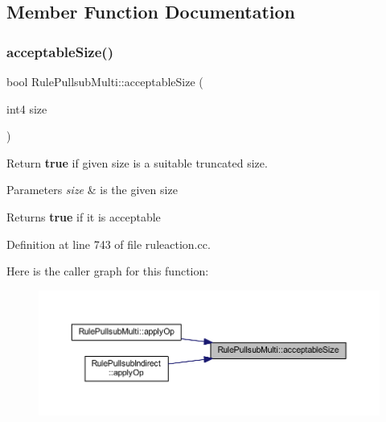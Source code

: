 \subsection{Member Function Documentation}
\mbox{\label{class_rule_pullsub_multi_a9bbbf48ca07f76c7d40a53feb65eded7}} 
\subsubsection{\texorpdfstring{acceptableSize()}{acceptableSize()}}
{\footnotesize\ttfamily bool Rule\+Pullsub\+Multi\+::acceptable\+Size (\begin{DoxyParamCaption}\item[{int4}]{size }\end{DoxyParamCaption})\hspace{0.3cm}{\ttfamily [static]}}



Return {\bfseries{true}} if given size is a suitable truncated size. 


\begin{DoxyParams}{Parameters}
{\em size} & is the given size \\
\hline
\end{DoxyParams}
\begin{DoxyReturn}{Returns}
{\bfseries{true}} if it is acceptable 
\end{DoxyReturn}


Definition at line 743 of file ruleaction.\+cc.

Here is the caller graph for this function\+:
\nopagebreak
\begin{figure}[H]
\begin{center}
\leavevmode
\includegraphics[width=350pt]{class_rule_pullsub_multi_a9bbbf48ca07f76c7d40a53feb65eded7_icgraph}
\end{center}
\end{figure}
\mbox{\label{class_rule_pullsub_multi_ae66401a1bda28e0332a3058b276fdca5}} 
